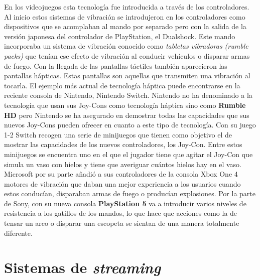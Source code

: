 En los videojuegos esta tecnolog\'ia fue introducida a trav\'es de los controladores. Al inicio estos sistemas de vibraci\'on se introdujeron en los controladores como dispositivos que se acomplaban al mando por separado pero con la salida de la versi\'on japonesa del controlador de PlayStation, el Dualshock. Este mando incorporaba un sistema de vibraci\'on conocido como \textit{tabletas vibradoras (rumble packs)} que ten\'ian ese efecto de vibraci\'on al conducir veh\'iculos o disparar armas de fuego. Con la llegada de las pantallas t\'actiles tambi\'en aparecieron las pantallas h\'apticas. Estas pantallas son aquellas que transmiten una vibraci\'on al tocarla. El ejemplo m\'as actual de tecnolog\'ia h\'aptica puede encontrarse en la reciente consola de Nintendo, Nintendo Switch. Nintendo no ha denominado a la tecnolog\'ia que usan sus Joy-Cons como tecnolog\'ia h\'aptica sino como \textbf{Rumble HD} pero Nintendo se ha asegurado en demostrar todas las capacidades que sus nuevos Joy-Cons pueden ofrecer en cuanto a este tipo de tecnolog\'ia. Con su juego 1-2 Switch recogen una serie de minijuegos que tienen como objetivo el de mostrar las capacidades de los nuevos controladores, los Joy-Con. Entre estos minijuegos se encuentra uno en el que el jugador tiene que agitar el Joy-Con que simula un vaso con hielos y tiene que averiguar cu\'antos hielos hay en el vaso. Microsoft por su parte a\~nadi\'o a sus controladores de la consola Xbox One 4 motores de vibraci\'on que daban una mejor experiencia a los usuarios cuando estos conduc\'ian, disparaban armas de fuego o produc\'ian explosiones.  Por la parte de Sony, con su nueva consola \textbf{PlayStation 5} va a introducir varios niveles de resistencia a los gatillos de los mandos, lo que hace que acciones como la de tensar un arco o disparar una escopeta se sientan de una manera totalmente diferente.


\section{Sistemas de \textit{streaming}}


